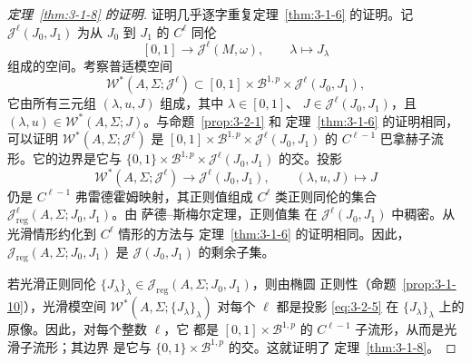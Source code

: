 \begin{proof}[定理~\ref{thm:3-1-8} 的证明]
证明几乎逐字重复定理~\ref{thm:3-1-6} 的证明。记
$\mathcal J^\ell(J_0,J_1)$ 为从 $J_0$ 到 $J_1$ 的 $C^\ell$ 同伦
\[
  [0,1]\longrightarrow\mathcal J^\ell(M,\omega),
  \qquad \lambda\longmapsto J_\lambda
\]
组成的空间。考察普适模空间
\[
  \mathcal W^*(A,\Sigma;\mathcal J^\ell)
  \subset[0,1]\times\mathcal B^{1,p}
  \times\mathcal J^\ell(J_0,J_1),
\]
它由所有三元组 $(\lambda,u,J)$ 组成，其中 $\lambda\in[0,1]$、
$J\in\mathcal J^\ell(J_0,J_1)$，且
$(\lambda,u)\in\mathcal W^*(A,\Sigma;J)$。与命题~\ref{prop:3-2-1} 和
定理~\ref{thm:3-1-6} 的证明相同，可以证明
$\mathcal W^*(A,\Sigma;\mathcal J^\ell)$ 是
$[0,1]\times\mathcal B^{1,p}\times\mathcal J^\ell(J_0,J_1)$ 的
$C^{\ell-1}$ 巴拿赫子流形。它的边界是它与
$\{0,1\}\times\mathcal B^{1,p}\times\mathcal J^\ell(J_0,J_1)$ 的交。投影
\begin{equation}\label{eq:3-2-5}
  \mathcal W^*(A,\Sigma;\mathcal J^\ell)
  \longrightarrow\mathcal J^\ell(J_0,J_1),
  \qquad
  (\lambda,u,J)\longmapsto J
\end{equation}
仍是 $C^{\ell-1}$ 弗雷德霍姆映射，其正则值组成 $C^\ell$ 类正则同伦的集合
$\mathcal J_{\mathrm{reg}}^\ell(A,\Sigma;J_0,J_1)$。由 萨德--斯梅尔定理，正则值集
在 $\mathcal J^\ell(J_0,J_1)$ 中稠密。从光滑情形约化到 $C^\ell$ 情形的方法与
定理~\ref{thm:3-1-6} 的证明相同。因此，
$\mathcal J_{\mathrm{reg}}(A,\Sigma;J_0,J_1)$ 是
$\mathcal J(J_0,J_1)$ 的剩余子集。

若光滑正则同伦
$\{J_\lambda\}_\lambda\in\mathcal J_{\mathrm{reg}}(A,\Sigma;J_0,J_1)$，则由椭圆
正则性（命题~\ref{prop:3-1-10}），光滑模空间
$\mathcal W^*(A,\Sigma;\{J_\lambda\}_\lambda)$ 对每个 $\ell$ 都是投影
\eqref{eq:3-2-5} 在 $\{J_\lambda\}_\lambda$ 上的原像。因此，对每个整数 $\ell$，它
都是 $[0,1]\times\mathcal B^{1,p}$ 的 $C^{\ell-1}$ 子流形，从而是光滑子流形；其边界
是它与 $\{0,1\}\times\mathcal B^{1,p}$ 的交。这就证明了
定理~\ref{thm:3-1-8}。
\end{proof}

